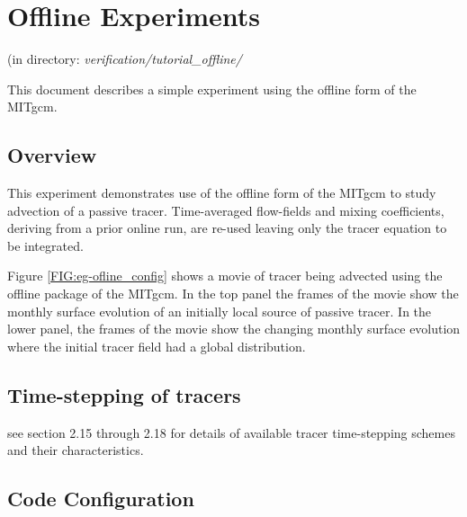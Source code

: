 % 

\section[Offline Example]{Offline Experiments}
\label{www:tutorials}
\label{sect:eg-offline}
\begin{center}
(in directory: {\it verification/tutorial\_offline/}\\
\end{center}

%
%

This document describes a simple experiment using the offline form of
the MITgcm.

\subsection{Overview}
\label{www:tutorials}

This experiment demonstrates use of the offline form of the MITgcm to
study advection of a passive tracer. Time-averaged flow-fields and
mixing coefficients, deriving from a prior online run, are re-used
leaving only the tracer equation to be integrated.

Figure \ref{FIG:eg-ofline_config} shows a movie of tracer being
advected using the offline package of the MITgcm. In the top panel the
frames of the movie show the monthly surface evolution of an initially
local source of passive tracer. In the lower panel, the frames of the
movie show the changing monthly surface evolution where the initial
tracer field had a global distribution.

\subsection{Time-stepping of tracers}
\label{www:tutorials}

\noindent see section 2.15 through 2.18 for details of available
tracer time-stepping schemes and their characteristics.

\subsection{Code Configuration}
\label{www:tutorials}
\label{SEC:eg_offl_code_config}

